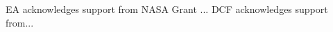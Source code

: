 \documentclass[graybox,natbib,nosecnum]{svmult}
\begin{document}
%


\begin{acknowledgement}
EA acknowledges support from NASA Grant ...  DCF acknowledges support from...
\end{acknowledgement}

\end{document}
